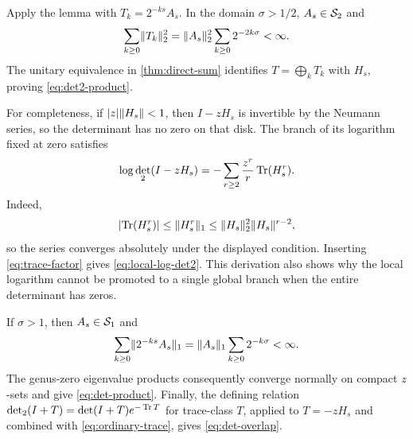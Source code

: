 Apply the lemma with $T_k=2^{-ks}A_s$.  In the domain $\sigma>1/2$,
$A_s\in\mathcal S_{2}$ and
\[
  \sum_{k\ge0}\lVert T_k\rVert_2^2
  =\lVert A_s\rVert_2^2\sum_{k\ge0}2^{-2k\sigma}<\infty.
\]
The unitary equivalence in \cref{thm:direct-sum} identifies
$T=\bigoplus_kT_k$ with $H_s$, proving \cref{eq:det2-product}.

For completeness, if $\lvert z\rvert\lVert H_s\rVert<1$, then $I-zH_s$ is invertible by
the Neumann series, so the determinant has no zero on that disk.  The branch
of its logarithm fixed at zero satisfies
\[
  \log\det_2(I-zH_s)
  =-\sum_{r\ge2}\frac{z^r}{r}\operatorname{Tr}(H_s^r).
\]
Indeed,
\[
  \lvert \operatorname{Tr}(H_s^r)\rvert
  \le\lVert H_s^r\rVert_1
  \le\lVert H_s\rVert_2^2\lVert H_s\rVert^{r-2},
\]
so the series converges absolutely under the displayed condition.  Inserting
\cref{eq:trace-factor} gives \cref{eq:local-log-det2}.  This derivation also
shows why the local logarithm cannot be promoted to a single global branch
when the entire determinant has zeros.

If $\sigma>1$, then $A_s\in\mathcal S_{1}$ and
\[
  \sum_{k\ge0}\lVert 2^{-ks}A_s\rVert_1
  =\lVert A_s\rVert_1\sum_{k\ge0}2^{-k\sigma}<\infty.
\]
The genus-zero eigenvalue products consequently converge normally on compact
$z$-sets and give \cref{eq:det-product}.  Finally, the defining relation
$\det_2(I+T)=\det(I+T)e^{-\operatorname{Tr} T}$ for trace-class $T$, applied to
$T=-zH_s$ and combined with \cref{eq:ordinary-trace}, gives
\cref{eq:det-overlap}.

